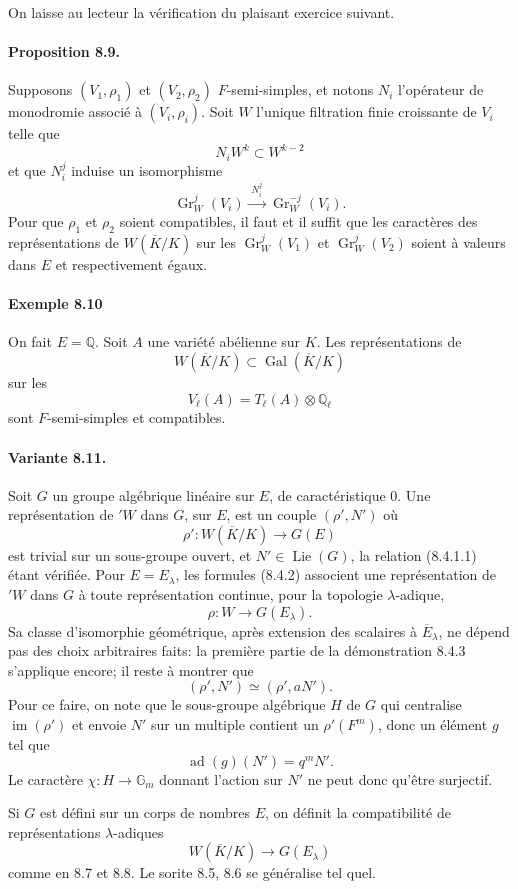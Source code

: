 \documentclass[10pt,letterpaper]{article}
\newcommand{\Q}{\mathbb Q}
\newcommand{\Gal}{\operatorname{Gal}}
\providecommand{\im}{\operatorname{im}}
\providecommand{\Gal}{\operatorname{Gal}}
\providecommand{\im}{\operatorname{im}}
\providecommand{\Lie}{\operatorname{Lie}}
\providecommand{\Lie}{\operatorname{Lie}}
\providecommand{\im}{\operatorname{im}}
\providecommand{\ad}{\operatorname{ad}}
\providecommand{\Gr}{\operatorname{Gr}}
\providecommand{\Gal}{\operatorname{Gal}}
\providecommand{\Gal}{\operatorname{Gal}}
\providecommand{\Gal}{\operatorname{Gal}}
\begin{document}
On laisse au lecteur la vérification du plaisant exercice suivant.

\paragraph{Proposition 8.9.} Supposons $(V_1,\rho_1)$ et $(V_2,\rho_2)$ $F$-semi-simples, et notons $N_i$ l'opérateur de monodromie associé à $(V_i,\rho_i)$. Soit $W$ l'unique filtration finie croissante de $V_i$ telle que
\[
N_i W^k\subset W^{k-2}
\]
et que $N_i^j$ induise un isomorphisme
\[
\Gr_W^j(V_i)\xrightarrow{\;N_i^j\;}\Gr_W^{-j}(V_i).
\]
Pour que $\rho_1$ et $\rho_2$ soient compatibles, il faut et il suffit que les caractères des représentations de $W(\overline K/K)$ sur les $\Gr_W^j(V_1)$ et $\Gr_W^j(V_2)$ soient à valeurs dans $E$ et respectivement égaux.

\paragraph{Exemple 8.10} On fait $E=\Q$. Soit $A$ une variété abélienne sur $K$. Les représentations de
\[
W(\overline K/K)\subset \Gal(\overline K/K)
\]
sur les
\[
V_\ell(A)=T_\ell(A)\otimes\Q_\ell
\]
sont $F$-semi-simples et compatibles.

\paragraph{Variante 8.11.} Soit $G$ un groupe algébrique linéaire sur $E$, de caractéristique $0$. Une représentation de ${}'W$ dans $G$, sur $E$, est un couple $(\rho',N')$ où
\[
\rho':W(\overline K/K)\longrightarrow G(E)
\]
est trivial sur un sous-groupe ouvert, et $N'\in\Lie(G)$, la relation (8.4.1.1) étant vérifiée. Pour $E=E_\lambda$, les formules (8.4.2) associent une représentation de ${}'W$ dans $G$ à toute représentation continue, pour la topologie $\lambda$-adique,
\[
\rho:W\longrightarrow G(E_\lambda).
\]
Sa classe d'isomorphie géométrique, après extension des scalaires à $\overline E_\lambda$, ne dépend pas des choix arbitraires faits: la première partie de la démonstration 8.4.3 s'applique encore; il reste à montrer que
\[
(\rho',N')\simeq(\rho',aN').
\]
Pour ce faire, on note que le sous-groupe algébrique $H$ de $G$ qui centralise $\im(\rho')$ et envoie $N'$ sur un multiple contient un $\rho'(F^m)$, donc un élément $g$ tel que
\[
\ad(g)(N')=q^mN'.
\]
Le caractère $\chi:H\to\mathbb G_m$ donnant l'action sur $N'$ ne peut donc qu'être surjectif.

Si $G$ est défini sur un corps de nombres $E$, on définit la compatibilité de représentations $\lambda$-adiques
\[
W(\overline K/K)\longrightarrow G(E_\lambda)
\]
comme en 8.7 et 8.8. Le sorite 8.5, 8.6 se généralise tel quel.
\end{document}
